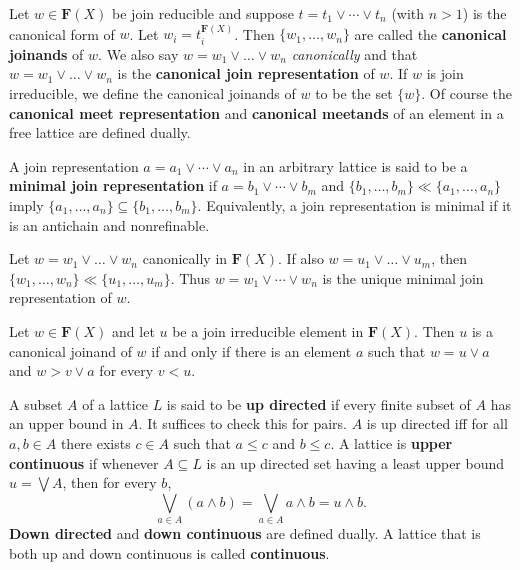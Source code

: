Let $w \in \mathbf F(X)$ be join reducible and suppose 
$t = t_1 \vee \cdots \vee t_n$ (with $n > 1$) is the
canonical form of $w$. 
Let $w_i = t_i^{\mathbf F(X)}$.  Then $\{w_1, \dots, w_n\}$ are called the 
\textbf{canonical joinands} of $w$. We also say $w = w_1 \vee \dots \vee w_n$
\textit{canonically} and that  $w = w_1 \vee \dots \vee w_n$
is the \textbf{canonical join representation} of $w$. 
If $w$ is join irreducible, we define the canonical joinands of $w$ to be the set 
$\{w\}$. Of course the \textbf{canonical meet representation} and 
\textbf{canonical meetands} of an element in a free lattice are defined dually. 

A join representation $a = a_1 \vee \cdots \vee a_n$ in an arbitrary lattice is 
said to be a \textbf{minimal join representation} if 
$a = b_1 \vee \cdots \vee b_m$  and $\{b_1, \dots, b_m\} \ll \{a_1, \dots, a_n\}$
imply $\{a_1, \dots, a_n\} \subseteq \{b_1, \dots, b_m\}$. Equivalently, 
a join representation is minimal if it is an antichain and nonrefinable.

\begin{theorem} \label{thm:1.19}
Let $w = w_1 \vee \dots \vee w_n$ canonically in $\mathbf F(X)$.
If also $w = u_1 \vee \dots \vee u_m$, then 
$\{w_1, \dots, w_n\} \ll \{u_1, \dots, u_m\}$.
Thus $w = w_1 \vee \cdots \vee w_n$ is the unique minimal join representation of $w$.
\end{theorem}

\begin{theorem} 
Let $w \in \mathbf F (X)$ and let $u$ be a join irreducible element in
$\mathbf F(X)$. Then $u$ is a canonical joinand of $w$ if and only if there 
is an element $a$ such that $w = u \vee a$ and $w > v \vee a$ for every $v < u$.
\end{theorem}

\begin{definition} A subset $A$ of a lattice $L$ is said 
  to be \textbf{up directed} if every finite subset of $A$ has an upper bound in $A$.
  It suffices to check this for pairs.  $A$ is up directed iff for all $a, b \in A$
  there exists $c\in A$ such that $a\leqslant c$ and $b\leqslant c$.  
  A lattice is \textbf{upper continuous} if whenever $A\subseteq L$ is an up 
  directed set having a least upper bound $u = \bigvee A$, then for every $b$,
  \[\bigvee_{a\in A} (a \wedge b) = 
  \bigvee_{a\in A} a \wedge b =  u \wedge b.\]
\noindent  \textbf{Down directed} and \textbf{down continuous} are defined dually.  A lattice that is 
  both up and down continuous is called \textbf{continuous}.
\end{definition}

